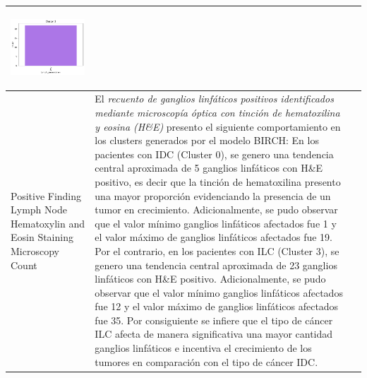 \begin{table}[htb!]
\begin{threeparttable}
\begin{tabular}{p{2.5cm} p{7cm} p{6.5cm}}
			\begin{center}\includegraphics[width=1\linewidth]{NOTEBOOK/IMAGENES_BIRCH_CLUSTERING/6_Cluster_3_lymph_presentation}\end{center}
			
			\\ \hline
			Positive Finding Lymph Node Hematoxylin and Eosin Staining Microscopy Count
			& El \textit{recuento de ganglios linfáticos positivos identificados mediante microscopía óptica con tinción de hematoxilina y eosina (H\&E)} presento el siguiente comportamiento en los clusters generados por el modelo BIRCH: En los pacientes con IDC (Cluster 0), se genero una tendencia central aproximada de 5 ganglios linfáticos con H\&E positivo, es decir que la tinción de hematoxilina presento una mayor proporción evidenciando la presencia de un tumor en crecimiento. Adicionalmente, se pudo observar que  el valor mínimo ganglios linfáticos afectados fue 1 y el valor máximo de ganglios linfáticos afectados fue 19. Por el contrario, en los pacientes con ILC (Cluster 3), se genero una tendencia central aproximada de 23 ganglios linfáticos con H\&E positivo. Adicionalmente, se pudo observar que el valor mínimo ganglios linfáticos afectados fue 12 y el valor máximo de ganglios linfáticos afectados fue 35. Por consiguiente se infiere que el tipo de cáncer ILC afecta de manera significativa una mayor cantidad ganglios linfáticos e incentiva el crecimiento de los tumores en comparación con el tipo de cáncer IDC.
			

\end{tabular}
\end{threeparttable}
\end{table}
